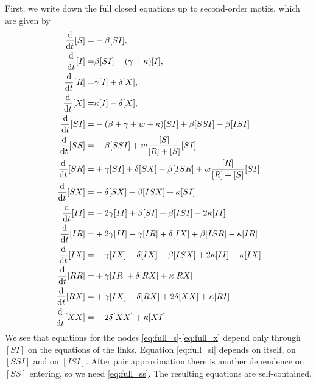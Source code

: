 \documentclass[12pt]{article}
\def\txtd{{\textnormal{d}}}
\begin{document}
First, we write down the full closed equations up to second-order motifs, which are given by
\begin{align}
\frac{\txtd }{\txtd t} [S]
 =&
 -\beta [SI], 
 \label{eq:full_s}
 \\
 \frac{\txtd }{\txtd t} [I]
 =&
 \beta [SI] - (\gamma + \kappa)[I],
 \label{eq:full_i}
 \\
 \frac{\txtd }{\txtd t} [R]
 =&
\gamma [I] +\delta[X],
\label{eq:full_r}
 \\
 \frac{\txtd }{\txtd t} [X]
 =&
\kappa[I] - \delta[X],
\label{eq:full_x}
 \\
 \frac{\txtd }{\txtd t} [SI]
 =&
 -(\beta+\gamma+w+\kappa)[SI] + \beta[SSI] -\beta[ISI]
 \label{eq:full_si}
 \\
 \frac{\txtd }{\txtd t} [SS]
 =&
- \beta [SSI] + w\frac{[S]}{[R]+[S]} [SI]
\label{eq:full_ss}
\\
\frac{\txtd }{\txtd t}{[SR]}=&
+\gamma [SI]
+\delta [SX]
-\beta [ISR]
+ w\frac{[R]}{[R]+[S]} [SI]
\label{eq:full_sr}
\\
\frac{\txtd }{\txtd t}{[SX]}=&
-\delta[SX]
-\beta [ISX]
+ \kappa [SI]
\label{eq:full_sx}
\\
\frac{\txtd }{\txtd t}{[II]}=&
-2\gamma [II]
+\beta [SI] + \beta [ISI]
-2\kappa [II]
\label{eq:full_ii}
\\
\frac{\txtd }{\txtd t}{[IR]}=&
+2\gamma [II] -\gamma [IR]
+\delta [IX]
+\beta [ISR]
-\kappa [IR]
\label{eq:full_ir}
\\
\frac{\txtd }{\txtd t}{[IX]}=&
- \gamma [IX]
- \delta [IX]
+ \beta [ISX]
+ 2\kappa [II] - \kappa [IX] 
\label{eq:full_ix}
\\
\frac{\txtd }{\txtd t}{[RR]}=&
+\gamma[IR]
+\delta[RX]
+\kappa[RX]
\label{eq:full_rr}
\\
\frac{\txtd }{\txtd t}{[RX]}=&
+\gamma[IX]
-\delta [RX] + 2\delta [XX]
+\kappa [RI]
\label{eq:full_rx}
\\
\frac{\txtd }{\txtd t}{[XX]}=&
-2 \delta [XX]
+ \kappa [XI]
\label{eq:full_xx}
\end{align}
We see that equations for the nodes \eqref{eq:full_s}-\eqref{eq:full_x} depend only through $[SI]$ on the equations of the links. Equation \eqref{eq:full_si} depends on itself, on $[SSI]$ and on $[ISI]$. After pair approximation there is another dependence on $[SS]$ entering, so we need \eqref{eq:full_ss}. The resulting equations are self-contained. 
\end{document}
